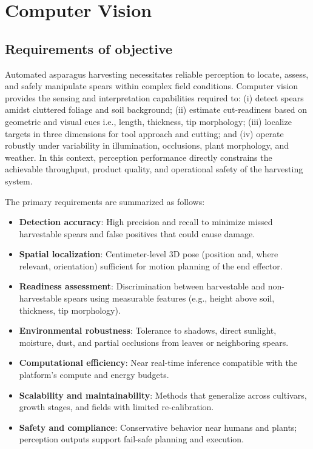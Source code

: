 \chapter{Computer Vision}
\section{Requirements of objective}
Automated asparagus harvesting necessitates reliable perception to locate, assess, and safely manipulate spears within complex 
field conditions. Computer vision provides the sensing and interpretation capabilities required to: (i) detect spears amidst 
cluttered foliage and soil background; (ii) estimate cut-readiness based on geometric and visual cues i.e., length, thickness, tip morphology; (iii) 
localize targets in three dimensions for tool approach and cutting; and (iv) operate robustly under variability in 
illumination, occlusions, plant morphology, and weather. In this context, perception performance directly constrains the 
achievable throughput, product quality, and operational safety of the harvesting system.

The primary requirements are summarized as follows:
\begin{itemize}
  \item \textbf{Detection accuracy}: High precision and recall to minimize missed harvestable spears and false positives that 
  could cause damage.
  \item \textbf{Spatial localization}: Centimeter-level 3D pose (position and, where relevant, orientation) sufficient for 
  motion planning of the end effector.
  \item \textbf{Readiness assessment}: Discrimination between harvestable and non-harvestable spears using measurable features 
  (e.g., height above soil, thickness, tip morphology).
  \item \textbf{Environmental robustness}: Tolerance to shadows, direct sunlight, moisture, dust, and partial occlusions from 
  leaves or neighboring spears.
  \item \textbf{Computational efficiency}: Near real-time inference compatible with the platform's compute and energy budgets.
  \item \textbf{Scalability and maintainability}: Methods that generalize across cultivars, growth stages, and fields with 
  limited re-calibration.
  \item \textbf{Safety and compliance}: Conservative behavior near humans and plants; perception outputs support fail-safe 
  planning and execution.
\end{itemize}

